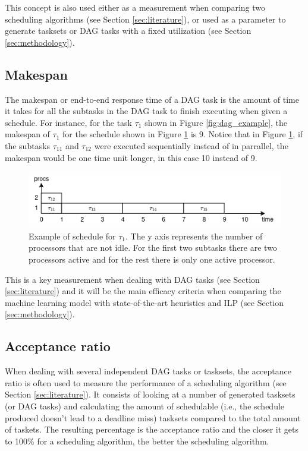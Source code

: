 This concept is also used either as a measurement
when comparing two scheduling algorithms (see Section \ref{sec:literature}),
or used as a parameter to generate tasksets or DAG tasks with 
a fixed utilization (see Section \ref{sec:methodology}).

\subsection{Makespan}

The makespan or end-to-end response time of a 
DAG task is the amount of time it takes for all the subtasks
in the DAG task to finish executing when given a schedule.
For instance, for the task $\tau_1$ shown in Figure \ref{fig:dag_example},
the makespan of $\tau_1$ for the schedule shown in Figure \ref{fig:schedule_example}
is 9.
Notice that in Figure \ref{fig:schedule_example},
if the subtasks $\tau_{11}$ and $\tau_{12}$ were executed 
sequentially instead of in parrallel, the makespan would be 
one time unit longer, in this case 10 instead of 9.

\begin{figure}
    \centering
    \includegraphics[width=0.5\linewidth]{images/schedule_example.png}
    \caption{Example of schedule for $\tau_1$. The y axis represents the number
    of processors that are not idle. For the first two subtasks there are two processors
    active and for the rest there is only one active processor.}
    \label{fig:schedule_example}
\end{figure}

This is a key measurement when dealing with DAG tasks (see Section \ref{sec:literature})
and it will be the main efficacy criteria when comparing 
the machine learning model with state-of-the-art heuristics and ILP
(see Section \ref{sec:methodology}).

\subsection{Acceptance ratio}

When dealing with several independent DAG tasks
or tasksets, 
the acceptance ratio is often used to measure the 
performance of a scheduling algorithm (see Section \ref{sec:literature}).
It consists of looking at a number of generated tasksets (or DAG tasks)
and calculating the amount of schedulable (i.e., 
the schedule produced doesn't lead to a deadline miss) tasksets compared to 
the total amount of taskets.
The resulting percentage is the acceptance ratio 
and the closer it gets to 100\% for a scheduling algorithm, the better the scheduling algorithm.

